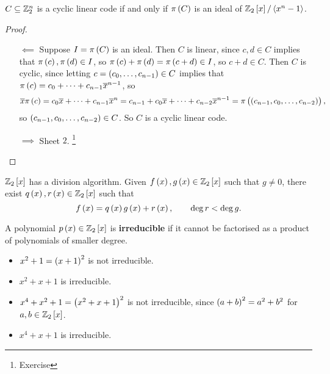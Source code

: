 \begin{proposition}
\label{prop:1.29}
$ C \subseteq \mathbb{Z}_2^n $ is a cyclic linear code if and only if $ \pi\br{C} $ is an ideal of $ \ZZ_2\sbr{x} / \abr{x^n - 1} $.
\end{proposition}

\begin{proof}
\hfill
\begin{itemize}
\item[$ \impliedby $] Suppose $ I = \pi\br{C} $ is an ideal. Then $ C $ is linear, since $ c, d \in C $ implies that $ \pi\br{c}, \pi\br{d} \in I $, so $ \pi\br{c} + \pi\br{d} = \pi\br{c + d} \in I $, so $ c + d \in C $. Then $ C $ is cyclic, since letting $ c = \br{c_0, \dots, c_{n - 1}} \in C $ implies that $ \pi\br{c} = c_0 + \dots + c_{n - 1}\overline{x}^{n - 1} $, so
$$ \overline{x}\pi\br{c} = c_0\overline{x} + \dots + c_{n - 1}\overline{x}^n = c_{n - 1} + c_0\overline{x} + \dots + c_{n - 2}\overline{x}^{n - 1} = \pi\br{\br{c_{n - 1}, c_0, \dots, c_{n - 2}}}, $$
so $ \br{c_{n - 1}, c_0, \dots, c_{n - 2}} \in C $. So $ C $ is a cyclic linear code.
\item[$ \implies $] Sheet $ 2 $. \footnote{Exercise}
\end{itemize}
\end{proof}

\pagebreak


\begin{fact*}
$ \ZZ_2\sbr{x} $ has a division algorithm. Given $ f\br{x}, g\br{x} \in \ZZ_2\sbr{x} $ such that $ g \ne 0 $, there exist $ q\br{x}, r\br{x} \in \ZZ_2\sbr{x} $ such that
$$ f\br{x} = q\br{x}g\br{x} + r\br{x}, \qquad \deg r < \deg g. $$
\end{fact*}

\begin{definition*}
A polynomial $ p\br{x} \in \ZZ_2\sbr{x} $ is \textbf{irreducible} if it cannot be factorised as a product of polynomials of smaller degree.
\end{definition*}

\begin{example*}
\hfill
\begin{itemize}
\item $ x^2 + 1 = \br{x + 1}^2 $ is not irreducible.
\item $ x^2 + x + 1 $ is irreducible.
\item $ x^4 + x^2 + 1 = \br{x^2 + x + 1}^2 $ is not irreducible, since $ \br{a + b}^2 = a^2 + b^2 $ for $ a, b \in \ZZ_2\sbr{x} $.
\item $ x^4 + x + 1 $ is irreducible.
\end{itemize}
\end{example*}

